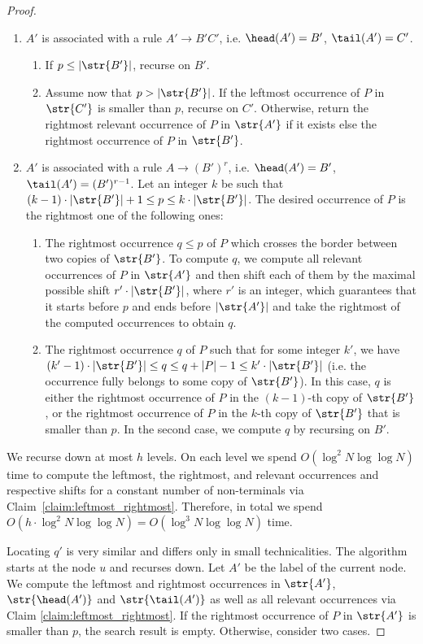 \begin{proof}
\begin{enumerate}
\item $A'$ is associated with a rule $A' \rightarrow B'C'$, i.e. $\head(A') = B'$, $\tail(A') = C'$. 
\begin{enumerate}
\item If $p \le |\str{B'}|$, recurse on $B'$. 
\item Assume now that $p > |\str{B'}|$. If the leftmost  occurrence of $P$ in $\str{C'}$ is smaller than $p$, recurse on $C'$. Otherwise, return the rightmost relevant occurrence of $P$ in $\str{A'}$ if it exists else the rightmost occurrence of $P$ in $\str{B'}$. 
\end{enumerate}
\item $A'$ is associated with a rule $A \rightarrow (B')^r$, i.e. $\head(A') = B'$, $\tail(A') = (B')^{r-1}$.  Let an integer $k$ be such that $(k-1) \cdot |\str{B'}|+1 \le p \le k \cdot |\str{B'}|$. The desired occurrence of $P$ is the rightmost one of the following ones:
\begin{enumerate}
    \item The rightmost occurrence $q \le p$ of $P$ which crosses the border between two copies of $\str{B'}$. To compute $q$, we compute all relevant occurrences of $P$ in $\str{A'}$ and then shift each of them by the maximal possible shift $r' \cdot |\str{B'}|$, where $r'$ is an integer, which guarantees that it starts before $p$ and ends before $|\str{A'}|$ and take the rightmost of the computed occurrences to obtain $q$.
    \item The rightmost occurrence $q$ of $P$ such that for some integer $k'$, we have $(k'-1) \cdot |\str{B'}| \le q \le q+|P|-1 \le k' \cdot |\str{B'}|$ (i.e. the occurrence fully belongs to some copy of $\str{B'}$). In this case, $q$ is either the rightmost occurrence of $P$ in the $(k-1)$-th copy of $\str{B'}$, or the rightmost occurrence of $P$ in the $k$-th copy of $\str{B'}$ that is smaller than $p$. In the second case, we compute $q$ by recursing on $B'$.
    \end{enumerate}
\end{enumerate}
    We recurse down at most $h$ levels. On each level we spend $O(\log^{2} N\log\log N)$ time to compute the leftmost, the rightmost, and relevant occurrences and respective shifts for a constant number of non-terminals via Claim~\ref{claim:leftmost_rightmost}. Therefore, in total we spend $O(h \cdot \log^{2} N\log\log N) = O(\log^{3} N\log\log N)$ time. 
    
    
Locating $q'$ is very similar and differs only in small technicalities. The algorithm starts at the node $u$ and recurses down. Let $A'$ be the label of the current node. We compute the leftmost and rightmost occurrences in $\str{A'}$, $\str{\head(A')}$ and $\str{\tail(A')}$ as well as all relevant occurrences via Claim \ref{claim:leftmost_rightmost}. If the rightmost occurrence of $P$ in $\str{A'}$ is smaller than $p$, the search result is empty. Otherwise, consider two cases. 


\end{proof}
